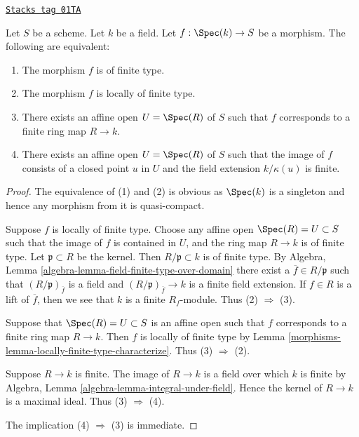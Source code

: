 \begin{lemma}
\label{morphisms-lemma-point-finite-type}
\href{https://stacks.math.columbia.edu/tag/01TA}{\texttt{Stacks tag 01TA}}

Let $S$ be a scheme. Let $k$ be a field.
Let $f : \Spec(k) \to S$ be a morphism.
The following are equivalent:
\begin{enumerate}
\item The morphism $f$ is of finite type.
\item The morphism $f$ is locally of finite type.
\item There exists an affine open $U = \Spec(R)$ of $S$
such that $f$ corresponds to a finite ring map $R \to k$.
\item There exists an affine open $U = \Spec(R)$ of $S$
such that the image of $f$ consists of a closed point $u$ in $U$
and the field extension $k/\kappa(u)$ is finite.
\end{enumerate}
\end{lemma}

\begin{proof}

The equivalence of (1) and (2) is obvious as $\Spec(k)$
is a singleton and hence any morphism from it is quasi-compact.

\medskip\noindent
Suppose $f$ is locally of finite type. Choose any affine open
$\Spec(R) = U \subset S$ such that the image of $f$
is contained in $U$, and the ring map $R \to k$
is of finite type. Let $\mathfrak p \subset R$ be the kernel.
Then $R/\mathfrak p \subset k$ is of finite type. By
Algebra, Lemma \ref{algebra-lemma-field-finite-type-over-domain}
there exist a $\overline{f} \in R/\mathfrak p$ such that
$(R/\mathfrak p)_{\overline{f}}$ is a field and
$(R/\mathfrak p)_{\overline{f}} \to k$ is a finite field
extension. If $f \in R$ is a lift of $\overline{f}$, then
we see that $k$ is a finite $R_f$-module. Thus (2) $\Rightarrow$ (3).

\medskip\noindent
Suppose that $\Spec(R) = U \subset S$ is an affine open
such that $f$ corresponds to a finite ring map $R \to k$.
Then $f$ is locally of finite type
by Lemma \ref{morphisms-lemma-locally-finite-type-characterize}.
Thus (3) $\Rightarrow$ (2).

\medskip\noindent
Suppose $R \to k$ is finite. The image of $R \to k$ is a field
over which $k$ is finite by
Algebra, Lemma \ref{algebra-lemma-integral-under-field}.
Hence the kernel of $R \to k$ is a maximal ideal.
Thus (3) $\Rightarrow$ (4).

\medskip\noindent
The implication (4) $\Rightarrow$ (3) is immediate.
\end{proof}

